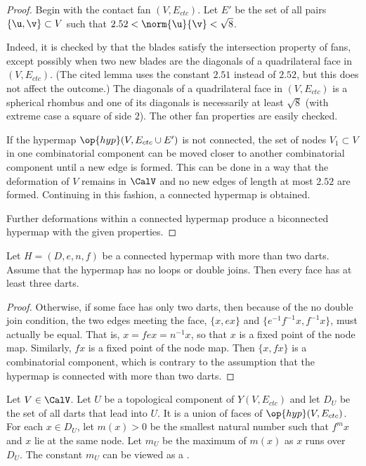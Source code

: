 \begin{proof}
  Begin with the contact fan $(V,E_{ctc})$.  Let $E'$ be the set
  of all pairs $\{\u,\v\}\subset V$ such that
  $2.52<\norm{\u}{\v}<\sqrt8$.

   Indeed, it is checked by
  \cite[Lemma~4.30]{Hales:2006:DCG} that the blades satisfy the
  intersection property of fans, except possibly when two new blades
  are the diagonals of a quadrilateral face in $(V,E_{ctc})$.  (The
  cited lemma uses the constant $2.51$ instead of $2.52$, but this
  does not affect the outcome.)  The diagonals of a quadrilateral face
  in $(V,E_{ctc})$ is a spherical rhombus and one of its diagonals is
  necessarily at least $\sqrt8$ (with extreme case a square of side
  $2$).  The other fan properties are easily checked.

  If the hypermap $\op{hyp}(V,E_{ctc}\cup E')$ is not connected,
  the set of nodes $V_1\subset V$ in one combinatorial component can
  be moved closer to another combinatorial component until a new edge
  is formed.  This can be done in a way that the deformation of $V$
  remains in $\CalV$ and no new edges of length at most $2.52$ are formed.
  Continuing in this fashion, a connected hypermap is obtained.

  Further deformations within a connected hypermap produce a
  biconnected hypermap with the given properties.
\end{proof}


\begin{lemma}\label{lemma:dj}
Let $H=(D,e,n,f)$ be a connected hypermap with more than
two darts.  Assume that the hypermap has no loops or double joins. Then
every face has at least three darts.
\end{lemma}

\begin{proof}
  Otherwise, if some face has only two darts, then because of the no
  double join condition, the two edges meeting the face, $\{x, e x\}$
  and $\{ e^{-1} f^{-1} x, f^{-1} x\}$, must actually be equal.  That
  is, $ x = f e x = n^{-1} x$, so that $x$ is a fixed point of the node
  map.  Similarly, $f x$ is a fixed point of the node map.  Then $\{x,
  f x\}$ is a combinatorial component, which is contrary to the
  assumption that the hypermap is connected with more than two darts.
\end{proof}


\begin{definition}[$D_U$,~$m_U$]
  Let $V\in \CalV$.  Let $U$ be a topological component of
  $Y(V,E_{ctc})$ and let $D_U$ be the set of all darts that lead into
  $U$.  It is a union of faces of $\op{hyp}(V,E_{ctc})$.  For each
  $x\in D_U$, let $m(x) >0$ be the smallest natural number such that
  $f^{m} x$ and $x$ lie at the same node.  Let $m_U$ be the maximum of
  $m(x)$  as $x$ runs over $D_U$.  The constant $m_U$ can be viewed as
  a .  %
\end{definition}

